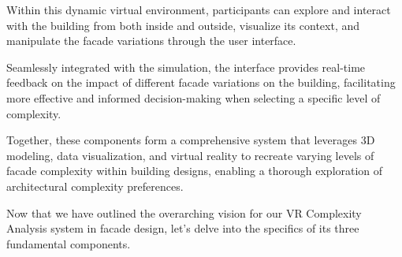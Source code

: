 Within this dynamic virtual environment, participants can explore and interact with the building from both inside and outside, visualize its context, and manipulate the facade variations through the user interface.

Seamlessly integrated with the simulation, the interface provides real-time feedback on the impact of different facade variations on the building, facilitating more effective and informed decision-making when selecting a specific level of complexity.

Together, these components form a comprehensive system that leverages 3D modeling, data visualization, and virtual reality to recreate varying levels of facade complexity within building designs, enabling a thorough exploration of architectural complexity preferences.

Now that we have outlined the overarching vision for our VR Complexity Analysis system in facade design, let's delve into the specifics of its three fundamental components.